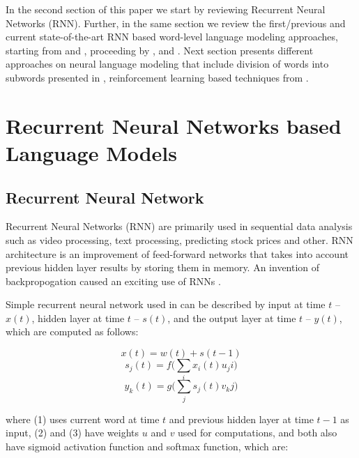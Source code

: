 \documentclass{IEEEtran}
\begin{document}

In the second section of this paper we start by reviewing Recurrent Neural Networks (RNN). Further, in the same section we review the first/previous and current state-of-the-art RNN based word-level language modeling approaches, starting from \cite{Mikolov2010NeuralLM} and \cite{Mikolov2011ExtensionsOR}, proceeding by \cite{Zaremba2014LSTM}, and \cite{Salakhutdinov2017Softmax}. Next section presents different approaches on neural language modeling that include division of words into subwords presented in \cite{Mikolov2011SubwordLM}, reinforcement learning based techniques from \cite{Quoc2017Reinforcement}.

\section{Recurrent Neural Networks based Language Models}

\subsection{Recurrent Neural Network}

Recurrent Neural Networks (RNN) are primarily used in sequential data analysis such as video processing, text processing, predicting stock prices and other. RNN architecture is an improvement of feed-forward networks that takes into account previous hidden layer results by storing them in memory. An invention of backpropogation caused an exciting use of RNNs \cite{deeplearning}.

Simple recurrent neural network used in \cite{Mikolov2010NeuralLM} can be described by input at time \(t\) -- \(x(t)\), hidden layer at time \(t\) -- \(s(t)\), and the output layer at time \(t\) -- \(y(t)\), which are computed as follows:

\begin{equation}
	x(t) = w(t) + s(t-1)
\end{equation}
\begin{equation}
	s_j(t) = f\Bigg(\sum_i{x_i(t)u_ji}\Bigg)
\end{equation}
\begin{equation}
	y_k(t) = g\Bigg(\sum_j{s_j(t) v_kj}\Bigg)
\end{equation}

where (1) uses current word at time \(t\) and previous hidden layer at time \(t-1\) as input, (2) and (3) have weights \(u\) and \(v\) used for computations, and both also have sigmoid activation function and softmax function, which are:
\end{document}
